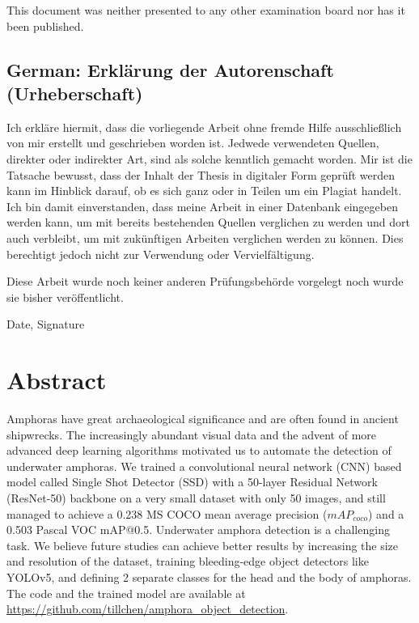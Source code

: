 \documentclass[a4paper, 11pt, oneside]{article}
\begin{document}
  This document was neither presented to any other examination board
  nor has it been published.

  \subsection*{German: Erklärung der Autorenschaft (Urheberschaft)}

  Ich erkläre hiermit, dass die vorliegende Arbeit ohne fremde Hilfe
  ausschließlich von mir erstellt und geschrieben worden ist. Jedwede
  verwendeten Quellen, direkter oder indirekter Art, sind als solche
  kenntlich gemacht worden. Mir ist die Tatsache bewusst, dass der
  Inhalt der Thesis in digitaler Form geprüft werden kann im Hinblick
  darauf, ob es sich ganz oder in Teilen um ein Plagiat handelt. Ich
  bin damit einverstanden, dass meine Arbeit in einer Datenbank
  eingegeben werden kann, um mit bereits bestehenden Quellen
  verglichen zu werden und dort auch verbleibt, um mit zukünftigen
  Arbeiten verglichen werden zu können. Dies berechtigt jedoch nicht
  zur Verwendung oder Vervielfältigung.

  Diese Arbeit wurde noch keiner anderen Prüfungsbehörde vorgelegt
  noch wurde sie bisher veröffentlicht.

  \vspace{20mm}

  Date, Signature

  \newpage

  \section*{Abstract}

  Amphoras have great archaeological significance and are often found in ancient shipwrecks. The increasingly abundant
  visual data and the advent of more advanced deep learning algorithms motivated us to automate the detection of
  underwater amphoras. We trained a convolutional neural network (CNN) based model called Single Shot Detector (SSD) with
  a 50-layer Residual Network (ResNet-50) backbone on a very small dataset with only 50 images, and still managed to
  achieve a 0.238 MS COCO mean average precision ($mAP_{coco}$) and a 0.503 Pascal VOC mAP@0.5. Underwater amphora
  detection is a challenging task. We believe future studies can achieve better results by increasing the size and
  resolution of the dataset, training bleeding-edge object detectors like YOLOv5, and defining 2 separate classes for
  the head and the body of amphoras. The code and the trained model are available at
  \url{https://github.com/tillchen/amphora_object_detection}.
\end{document}
